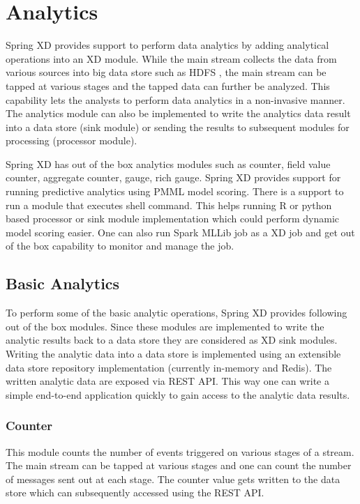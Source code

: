 \section{Analytics}

Spring XD provides support to perform data analytics by adding analytical operations into an XD module. While the main stream collects the data from various sources into big data store such as HDFS , the main stream can be tapped at various stages and the tapped data can further be analyzed. This capability lets the analysts to perform data analytics in a non-invasive manner. The analytics module can also be implemented to write the analytics data result into a data store (sink module) or sending the results to subsequent modules for processing (processor module). 

\par

Spring XD has out of the box analytics modules such as counter, field value counter, aggregate counter, gauge, rich gauge. Spring XD provides support for running predictive analytics using PMML model scoring. There is a support to run a module that executes shell command. This helps running R or python based processor or sink module implementation which could perform dynamic model scoring easier. One can also run Spark MLLib job as a XD job and get out of the box capability to monitor and manage the job.

\subsection {Basic Analytics}

To perform some of the basic analytic operations, Spring XD provides following out of the box modules. Since these modules are implemented to write the analytic results back to a data store they are considered as XD sink modules. Writing the analytic data into a data store is implemented using an extensible data store repository implementation (currently in-memory and Redis). The written analytic data are exposed via REST API. This way one can write a simple end-to-end application quickly to gain access to the analytic data results.

\subsubsection {Counter}

 This module counts the number of events triggered on various stages of a stream. The main stream can be tapped at various stages and one can count the number of messages sent out at each stage. The counter value gets written to the data store which can subsequently accessed using the REST API.
 
